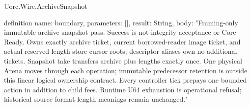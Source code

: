 \begin{lexlean}{Uorc.Wire.ArchiveSnapshot}
\begin{semanticmodule}
definition{
  name: boundary,
  parameters: [],
  result: String,
  body: "Framing-only immutable archive snapshot pass. Success is not integrity acceptance or Core Ready. Owns exactly archive ticket, current borrowed-reader image ticket, and actual reserved length-store cursor roots; descriptor aliases own no additional tickets. Snapshot take transfers archive plus lengths exactly once. One physical Arena moves through each operation; immutable predecessor retention is outside this linear logical ownership contract. Every controller tick prepays one bounded action in addition to child fees. Runtime U64 exhaustion is operational refusal; historical source format length meanings remain unchanged."
}
\end{semanticmodule}
\end{lexlean}
